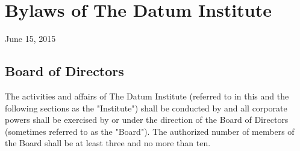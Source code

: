 \section{Bylaws of The Datum Institute}

June 15, 2015

\subsection{Board of Directors}

The activities and affairs of The Datum Institute (referred to in this and the following sections as the "Institute") shall be conducted by and all corporate powers shall be exercised by or under the direction of the Board of Directors (sometimes referred to as the "Board"). The authorized number of members of the Board shall be at least three and no more than ten. 

